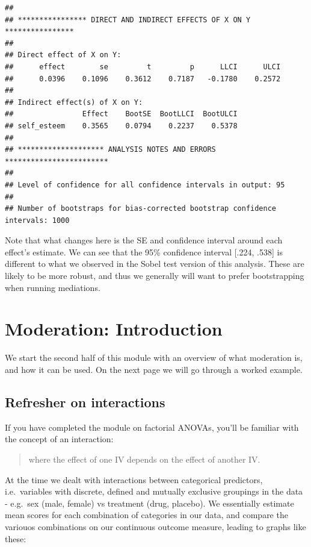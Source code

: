 \documentclass[
]{book}
\begin{document}
\begin{verbatim}
## 
## **************** DIRECT AND INDIRECT EFFECTS OF X ON Y ****************
## 
## Direct effect of X on Y:
##      effect        se         t         p      LLCI      ULCI
##      0.0396    0.1096    0.3612    0.7187   -0.1780    0.2572
## 
## Indirect effect(s) of X on Y:
##                Effect    BootSE  BootLLCI  BootULCI
## self_esteem    0.3565    0.0794    0.2237    0.5378
## 
## ******************** ANALYSIS NOTES AND ERRORS ************************ 
## 
## Level of confidence for all confidence intervals in output: 95
## 
## Number of bootstraps for bias-corrected bootstrap confidence intervals: 1000
\end{verbatim}

Note that what changes here is the SE and confidence interval around each effect's estimate. We can see that the 95\% confidence interval {[}.224, .538{]} is different to what we observed in the Sobel test version of this analysis. These are likely to be more robust, and thus we generally will want to prefer bootstrapping when running mediations.

\section{Moderation: Introduction}\label{moderation-introduction}

We start the second half of this module with an overview of what moderation is, and how it can be used. On the next page we will go through a worked example.

\subsection{Refresher on interactions}\label{refresher-on-interactions}

If you have completed the module on factorial ANOVAs, you'll be familiar with the concept of an interaction:

\begin{quote}
where the effect of one IV depends on the effect of another IV.
\end{quote}

At the time we dealt with interactions between categorical predictors, i.e.~variables with discrete, defined and mutually exclusive groupings in the data - e.g.~sex (male, female) vs treatment (drug, placebo). We essentially estimate mean scores for each combination of categories in our data, and compare the variouos combinations on our continuous outcome measure, leading to graphs like these:
\end{document}
